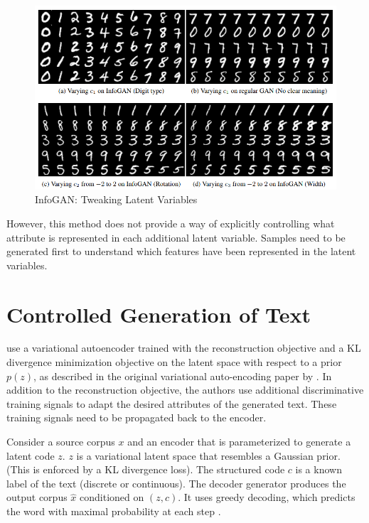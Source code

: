 \begin{figure}[ht]
	\centering
	\includegraphics[width=\textwidth]{images/infogan-digits}
	\caption{\label{fig:infogan-digits} InfoGAN: Tweaking Latent Variables}
\end{figure}

However, this method does not provide a way of explicitly controlling what attribute is represented in each additional latent variable. Samples need to be generated first to understand which features have been represented in the latent variables.


\section{Controlled Generation of Text}

\cite{hu2017toward} use a variational autoencoder trained with the reconstruction objective and a KL divergence minimization objective on the latent space with respect to a prior $p(z)$, as described in the original variational auto-encoding paper by \cite{kingma2013auto}. In addition to the reconstruction objective, the authors use additional discriminative training signals to adapt the desired attributes of the generated text. These training signals need to be propagated back to the encoder.

Consider a source corpus $x$ and an encoder that is parameterized to generate a latent code $z$. $z$ is a variational latent space that resembles a Gaussian prior. (This is enforced by a KL divergence loss). The structured code $c$ is a known label of the text (discrete or continuous). The decoder generator produces the output corpus $\hat{x}$ conditioned on $(z, c)$. It uses greedy decoding, which predicts the word with maximal probability at each step \citep{langlais2007greedy}.

